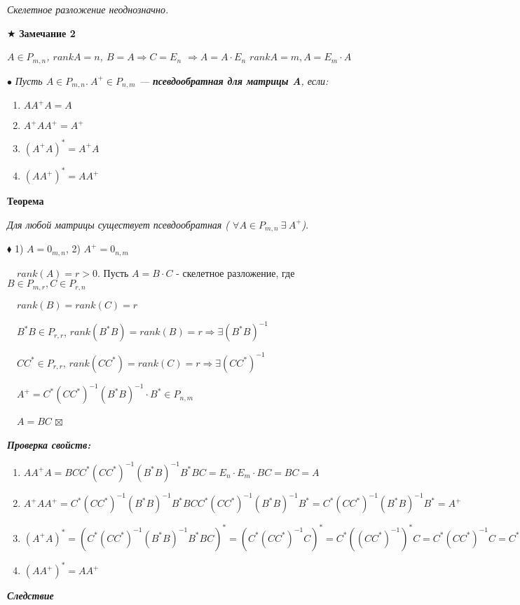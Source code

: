 \documentclass[a4paper, 12pt]{report}
\begin{document}
	\textit{Скелетное разложение неоднозначно.}
	\par\bigskip
	$\bigstar$\textbf{ Замечание 2}
	
	\textit{$A \in P_{m,n}$, $rank A = n$, $B=A \Rightarrow C = E_n$  $\Rightarrow A = A \cdot E_n$
		$rank A = m, A = E_m \cdot A$}
	\par\bigskip
	$\bullet$ \textit{Пусть $A \in P_{m,n}.\ A^+ \in P_{n,m} $ --- \textbf{псевдообратная для матрицы A}, если: }
	\begin{enumerate}
		\item $AA^+A=A$
		\item $A^+AA^+=A^+$
		\item $(A^+A)^*=A^+A$
		\item $(AA^+)^*=AA^+$
	\end{enumerate}
	
	\textbf{Теорема}
	
	\textit{Для любой матрицы существует псевдообратная ( $\forall A \in P_{m,n}\ \exists\ A^+$)}.
	\par\bigskip
	$\blacklozenge $ 1) $A = 0_{m,n}$, 2) $A^+ = 0_{n,m}$ 
	
	$\quad rank (A) = r > 0$. Пусть $A = B \cdot C$ - скелетное разложение, где $B \in P_{m, r}, C\in P_{r,n}$
	
	$\quad rank (B) = rank (C) = r$
	
	$\quad B^*B \in P_{r,r}$, $rank (B^*B) = rank (B) = r \Rightarrow \exists (B^*B)^{-1}$
	
	$\quad CC^* \in P_{r,r}$, $rank (CC^*) = rank (C) = r \Rightarrow \exists (CC^*)^{-1}$
	
	$\quad A^+ = C^*(CC^*)^{-1}(B^*B)^{-1}\cdot B^* \in P_{n, m}$
	
	$\quad A = BC$
	$\boxtimes$
	\par\bigskip
	\textbf{\textit{Проверка свойств:}}
	\begin{enumerate}
		\item $AA^+A=BCC^*(CC^*)^{-1}(B^*B)^{-1}B^*BC=E_n \cdot E_m \cdot BC = BC = A$
		\item $A^+AA^+=C^*(CC^*)^{-1}(B^*B)^{-1}B^*BCC^*(CC^*)^{-1}(B^*B)^{-1}B^* = C^*(CC^*)^{-1}(B^*B)^{-1}B^*=A^+$
		\item $(A^+A)^*=(C^*(CC^*)^{-1}(B^*B)^{-1}B^*BC)^*= (C^*(CC^*)^{-1}C)^*=C^*((CC^*)^{-1})^*C=C^*(CC^*)^{-1}C=C^*(CC^*)^{-1}(B^*B)^{-1}B^*BC=A^+A$
		\item $(AA^+)^*=AA^+$
	\end{enumerate}
	
	\textit{\textbf{Следствие}}
	
\end{document}
